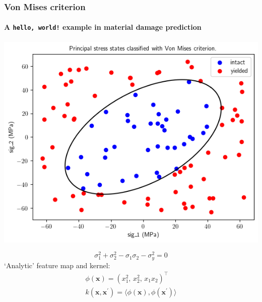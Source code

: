 \documentclass{beamer}
\begin{document}
    \begin{frame}
        \frametitle{Von Mises criterion}
        \framesubtitle{A \texttt{hello, world!} example in material damage prediction}
        
        
        \begin{minipage}{.45\textwidth}
            \centering
            \includegraphics[width=\textwidth]{pics/vm-data-envelope.png}
            
        \end{minipage}
        \hspace{1cm}
        \begin{minipage}{.3\textwidth}
            \[
                \sigma_1^2 + \sigma_2^2 -\sigma_1\sigma_2 - \sigma_y^2 = 0
            \]
            \pause
            `Analytic' feature map and kernel:
            \begin{gather*}
                \phi\left( \mathbf{x} \right) = \left( x_1^2,\, x_2^2,\, x_1 x_2 \right)^\top\\
                k\left( \mathbf{x}, \mathbf{x}^\prime \right) = \langle \phi\left( \mathbf{x} \right), \phi\left( \mathbf{x}^\prime \right) \rangle
            \end{gather*}
        \end{minipage}
        
        
    \end{frame}
    
\end{document}
